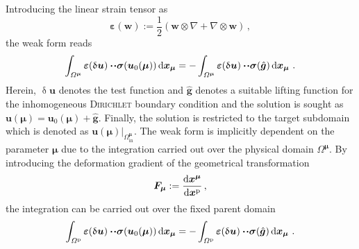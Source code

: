 \documentclass[a4paper]{eccomas_paper-2024}
\newcommand{\m}{\bm\mu}
\newcommand{\p}{\mathrm{p}}
\newcommand{\inrm}{\mathrm{in}}
\begin{document}
Introducing the linear strain tensor as
\begin{equation}
    \label{eq:eps}
    \bm\varepsilon(\bm{w}):= \frac{1}{2}\left(\bm{w}\otimes\nabla + \nabla\otimes\bm{w}\right)\,,
\end{equation}
the weak form reads 
\begin{equation}
    \int_{\varOmega^{\m}} \bm\varepsilon(\updelta\bm{u})\vdot\!\vdot\bm\sigma(\bm{u}_0(\m)) \dd{\bm{x}_{\m}} = -\int_{\varOmega^{\m}} \bm\varepsilon(\updelta\bm{u})\vdot\!\vdot\bm\sigma(\hat{\bm{g}})\dd{\bm{x}_{\m}}\,.
    \label{eq:weak_osp}
\end{equation}
Herein, $\updelta\bm{u}$ denotes the test function and $\hat{\bm{g}}$ denotes a suitable lifting function for the inhomogeneous \textsc{Dirichlet} boundary condition and the solution is sought as $\bm{u}(\m)=\bm{u}_0(\m)+\hat{\bm{g}}$.
Finally, the solution is restricted to the target subdomain which is denoted as $\bm{u}(\m)\big\vert_{\varOmega^{\m}_{\inrm}}$.
The weak form is implicitly dependent on the parameter $\m$ due to the integration carried out over the physical domain $\varOmega^{\m}$.
By introducing the deformation gradient of the geometrical transformation
\begin{equation}
    \bm{F}_{\m}:= \dv{\bm{x}^{\m}}{\bm{x}^{\p}}\,,
    \label{eq:F_mu}
\end{equation}
the integration can be carried out over the fixed parent domain
\begin{equation}
    \int_{\varOmega^{\p}} \bm\varepsilon(\updelta\bm{u})\vdot\!\vdot\bm\sigma(\bm{u}_0(\m)) \dd{\bm{x}_{\m}} = -\int_{\varOmega^{\p}} \bm\varepsilon(\updelta\bm{u})\vdot\!\vdot\bm\sigma(\hat{\bm{g}})\dd{\bm{x}_{\m}}\,.
    \label{eq:weak_osp_parent}
\end{equation}

\end{document}

